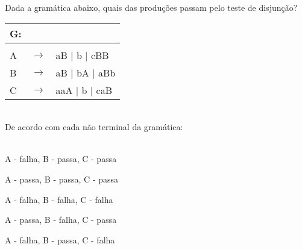 \question[10] 

Dada a gramática abaixo, quais das produções passam pelo teste de disjunção?\\
\begin{tabular}{|l c l}
	G: & & \\
	\hline \\
	A & $\rightarrow$ & aB | b | cBB \\
    B & $\rightarrow$ & aB | bA | aBb \\
	C & $\rightarrow$ & aaA | b | caB \\
\end{tabular}
\\
De acordo com cada não terminal da gramática:\\
\\
\begin{choices}
\item A - falha, B - passa, C - passa
\item A - passa, B - passa, C - passa
\item A - falha, B - falha, C - falha
\item A - passa, B - falha, C - passa %
\item A - falha, B - passa, C - falha
\end{choices}
\answerline

